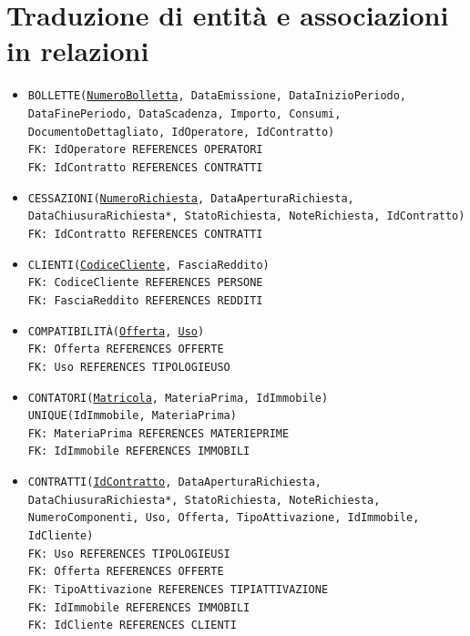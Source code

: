 \documentclass[a4paper,12pt]{report}
\begin{document}
\section{Traduzione di entità e associazioni in relazioni}
\begin{itemize}
    \item \texttt{BOLLETTE(\underline{NumeroBolletta}, DataEmissione, DataInizioPeriodo, DataFinePeriodo, DataScadenza, Importo, Consumi, DocumentoDettagliato, IdOperatore, IdContratto) \\
    FK: IdOperatore REFERENCES OPERATORI \\
    FK: IdContratto REFERENCES CONTRATTI}
    
    \item \texttt{CESSAZIONI(\underline{NumeroRichiesta}, DataAperturaRichiesta, DataChiusuraRichiesta*, StatoRichiesta, NoteRichiesta, IdContratto) \\
    FK: IdContratto REFERENCES CONTRATTI}
    
    \item \texttt{CLIENTI(\underline{CodiceCliente}, FasciaReddito) \\
    FK: CodiceCliente REFERENCES PERSONE \\
    FK: FasciaReddito REFERENCES REDDITI}
    
    \item \texttt{COMPATIBILITÀ(\underline{Offerta}, \underline{Uso}) \\
    FK: Offerta REFERENCES OFFERTE \\
    FK: Uso REFERENCES TIPOLOGIE\textunderscore USO
    }
    
    \item \texttt{CONTATORI(\underline{Matricola}, MateriaPrima, IdImmobile) \\
    UNIQUE(IdImmobile, MateriaPrima) \\
    FK: MateriaPrima REFERENCES MATERIE\textunderscore PRIME \\
    FK: IdImmobile REFERENCES IMMOBILI}
    
    \item \texttt{CONTRATTI(\underline{IdContratto}, DataAperturaRichiesta, DataChiusuraRichiesta*, StatoRichiesta, NoteRichiesta, NumeroComponenti, Uso, Offerta, TipoAttivazione, IdImmobile, IdCliente) \\
    FK: Uso REFERENCES TIPOLOGIE\textunderscore USI \\
    FK: Offerta REFERENCES OFFERTE \\
    FK: TipoAttivazione REFERENCES TIPI\textunderscore ATTIVAZIONE \\
    FK: IdImmobile REFERENCES IMMOBILI \\
    FK: IdCliente REFERENCES CLIENTI
    }
    

\end{itemize}
\end{document}
